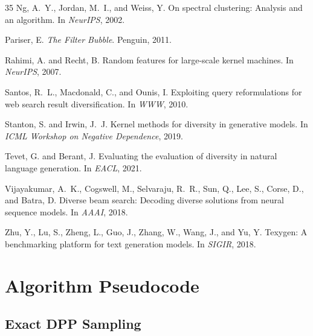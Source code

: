 \documentclass[11pt]{article}
\begin{document}
\begin{thebibliography}{35}
Ng, A.~Y., Jordan, M.~I., and Weiss, Y.
\newblock On spectral clustering: Analysis and an algorithm.
\newblock In \emph{NeurIPS}, 2002.

Pariser, E.
\newblock \emph{The Filter Bubble}.
\newblock Penguin, 2011.

Rahimi, A. and Recht, B.
\newblock Random features for large-scale kernel machines.
\newblock In \emph{NeurIPS}, 2007.

Santos, R.~L., Macdonald, C., and Ounis, I.
\newblock Exploiting query reformulations for web search result
  diversification.
\newblock In \emph{WWW}, 2010.

Stanton, S. and Irwin, J.~J.
\newblock Kernel methods for diversity in generative models.
\newblock In \emph{ICML Workshop on Negative Dependence}, 2019.

Tevet, G. and Berant, J.
\newblock Evaluating the evaluation of diversity in natural language generation.
\newblock In \emph{EACL}, 2021.

Vijayakumar, A.~K., Cogswell, M., Selvaraju, R.~R., Sun, Q., Lee, S.,
  Corse, D., and Batra, D.
\newblock Diverse beam search: Decoding diverse solutions from neural sequence
  models.
\newblock In \emph{AAAI}, 2018.

Zhu, Y., Lu, S., Zheng, L., Guo, J., Zhang, W., Wang, J., and Yu, Y.
\newblock Texygen: A benchmarking platform for text generation models.
\newblock In \emph{SIGIR}, 2018.

\end{thebibliography}

\clearpage
\appendix

\section{Algorithm Pseudocode}
\label{app:algorithms}

\subsection{Exact DPP Sampling}
\end{document}
